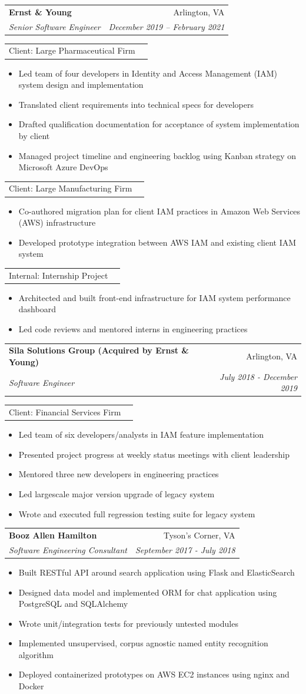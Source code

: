 \documentclass[letterpaper,11pt]{article}
\makeatletter
\newcommand{\resumeItem}[1]{
  \item\small{
    {#1 \vspace{-2pt}}
  }
}
\newcommand{\resumeSubheading}[4]{
  \vspace{-1pt}\item
    \begin{tabular*}{0.97\textwidth}[t]{l@{\extracolsep{\fill}}r}
      \textbf{#1} & #2 \\
      \textit{\small#3} & \textit{\small #4} \\
    \end{tabular*}\vspace{-1pt}
}
\newcommand{\resumeSubSubheading}[1]{
    \begin{tabular*}{0.97\textwidth}{l@{\extracolsep{\fill}}r}
      {\small#1} \\
    \end{tabular*}\vspace{-4pt}
}
\newcommand{\resumeItemListStart}{\begin{itemize}}
\newcommand{\resumeItemListEnd}{\end{itemize}\vspace{-5pt}}
\makeatother
\begin{document}
    \resumeSubheading
      {Ernst \& Young}{Arlington, VA}
      {Senior Software Engineer}{December 2019 -- February 2021}
      \resumeSubSubheading
      {Client: Large Pharmaceutical Firm}
      \resumeItemListStart
        \resumeItem{Led team of four developers in Identity and Access Management (IAM) system design and implementation}
        \resumeItem{Translated client requirements into technical specs for developers}
        \resumeItem{Drafted qualification documentation for acceptance of system implementation by client}
        \resumeItem{Managed project timeline and engineering backlog using Kanban strategy on Microsoft Azure DevOps}
      \resumeItemListEnd
      \resumeSubSubheading
      {Client: Large Manufacturing Firm}
      \resumeItemListStart
        \resumeItem{Co-authored migration plan for client IAM practices in Amazon Web Services (AWS) infrastructure}
        \resumeItem{Developed prototype integration between AWS IAM and existing client IAM system}
      \resumeItemListEnd

      \resumeSubSubheading
      {Internal: Internship Project}
      \resumeItemListStart
        \resumeItem{Architected and built front-end infrastructure for IAM system performance dashboard}
        \resumeItem{Led code reviews and mentored interns in engineering practices}
      \resumeItemListEnd

    \resumeSubheading
      {Sila Solutions Group \small(Acquired by Ernst \& Young)}{Arlington, VA}
      {Software Engineer}{July 2018 - December 2019}
      \resumeSubSubheading
      {Client: Financial Services Firm}
      \resumeItemListStart
        \resumeItem{Led team of six developers/analysts in IAM feature implementation}
        \resumeItem{Presented project progress at weekly status meetings with client leadership}
        \resumeItem{Mentored three new developers in engineering practices}
        \resumeItem{Led largescale major version upgrade of legacy system}
        \resumeItem{Wrote and executed full regression testing suite for legacy system}
      \resumeItemListEnd

    \resumeSubheading
      {Booz Allen Hamilton}{Tyson's Corner, VA}
      {Software Engineering Consultant}{September 2017 - July 2018}
      \resumeItemListStart
        \resumeItem{Built RESTful API around search application using Flask and ElasticSearch}
        \resumeItem{Designed data model and implemented ORM for chat application using PostgreSQL and SQLAlchemy}
        \resumeItem{Wrote unit/integration tests for previously untested modules}
        \resumeItem{Implemented unsupervised, corpus agnostic named entity recognition algorithm}
        \resumeItem{Deployed containerized prototypes on AWS EC2 instances using nginx and Docker}
      \resumeItemListEnd
\end{document}
